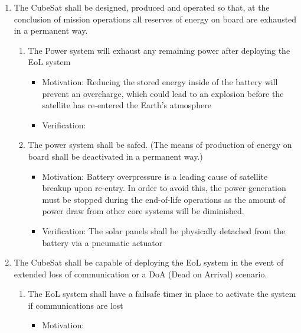 \begin{enumerate}
\begin{enumerate}
\begin{enumerate}
\begin{itemize}
                    \item Verification: Literature review of the materials
                \end{itemize}
        \end{enumerate}
        \item The CubeSat shall be designed, produced and operated so that, at the conclusion of mission operations all reserves of energy on board are exhausted in a permanent way.
        \begin{enumerate}
            \item The Power system will exhaust any remaining power after deploying the EoL system 
                \begin{itemize}
                    \item Motivation: Reducing the stored energy inside of the battery will prevent an overcharge, which could lead to an explosion before the satellite has re-entered the Earth’s atmosphere
                    \item Verification: 
                \end{itemize}
            \item The power system shall be safed. (The means of production of energy on board shall be deactivated in a permanent way.) 
                \begin{itemize}
                    \item Motivation: Battery overpressure is a leading cause of satellite breakup upon re-entry. In order to avoid this, the power generation must be stopped during the end-of-life operations as the amount of power draw from other core systems will be diminished.
                    \item Verification: The solar panels shall be physically detached from the battery via a pneumatic actuator 
                \end{itemize}
             \end{enumerate} 
            \item The CubeSat shall be capable of deploying the EoL system in the event of extended loss of communication or a DoA (Dead on Arrival) scenario. 
            \begin{enumerate}
                \item The EoL system shall have a failsafe timer in place to activate the system if communications are lost 
                \begin{itemize}
                    \item Motivation:

\end{itemize}
\end{enumerate}
\end{enumerate}
\end{enumerate}
